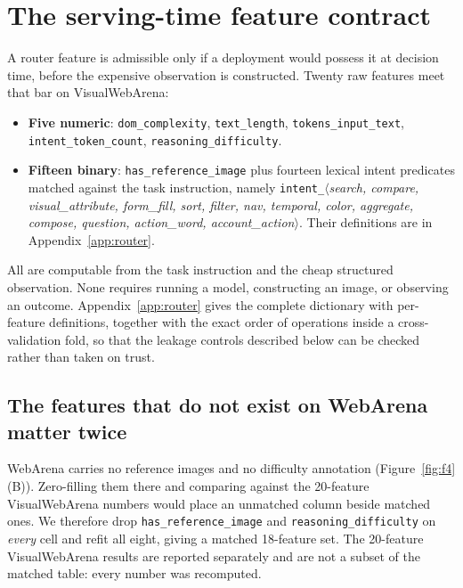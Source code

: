 \FloatBarrier
\section{The serving-time feature contract}
\label{sec:features}

A router feature is admissible only if a deployment would possess it at decision
time, before the expensive observation is constructed. Twenty raw features meet
that bar on VisualWebArena:

\begin{itemize}[leftmargin=1.5em]
\item \textbf{Five numeric}: \texttt{dom\_complexity}, \texttt{text\_length},
      \texttt{tokens\_input\_text}, \texttt{intent\_token\_count},
      \texttt{reasoning\_difficulty}.
\item \textbf{Fifteen binary}: \texttt{has\_reference\_image} plus fourteen
      lexical intent predicates matched against the task instruction, namely
      \texttt{intent\_}$\langle$\emph{search, compare, visual\_attribute,
      form\_fill, sort, filter, nav, temporal, color, aggregate, compose,
      question, action\_word, account\_action}$\rangle$. Their definitions are
      in Appendix~\ref{app:router}.
\end{itemize}

All are computable from the task instruction and the cheap structured
observation. None requires running a model, constructing an image, or observing
an outcome. Appendix~\ref{app:router} gives the complete dictionary with
per-feature definitions, together with the exact order of operations inside a
cross-validation fold, so that the leakage controls described below can be
checked rather than taken on trust.

\subsection{The features that do not exist on WebArena matter twice}
\label{sec:matched-features}

WebArena carries no reference images and no difficulty annotation
(Figure~\ref{fig:f4}(B)). Zero-filling them there and comparing against the
20-feature VisualWebArena numbers would place an unmatched column beside matched
ones. We therefore drop \texttt{has\_reference\_image} and
\texttt{reasoning\_difficulty} on \emph{every} cell and refit all eight, giving
a matched 18-feature set. The 20-feature VisualWebArena results are reported
separately and are not a subset of the matched table: every number was recomputed.

